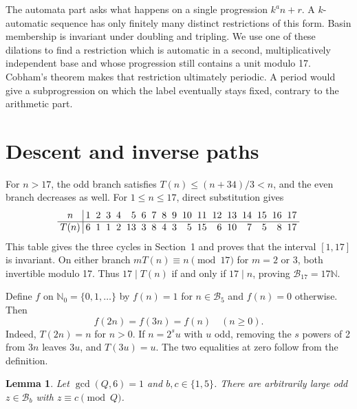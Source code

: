 \documentclass[11pt,a4paper]{article}
\newtheorem{lemma}[theorem]{Lemma}
\newcommand{\N}{\mathbb N}
\newcommand{\NN}{\mathbb N_0}
\newcommand{\B}{\mathcal B}
\begin{document}
The automata part asks what happens on a single progression $k^a n+r$. A $k$-automatic sequence has only finitely many distinct restrictions of this form. Basin membership is invariant under doubling and tripling. We use one of these dilations to find a restriction which is automatic in a second, multiplicatively independent base and whose progression still contains a unit modulo 17. Cobham's theorem makes that restriction ultimately periodic. A period would give a subprogression on which the label eventually stays fixed, contrary to the arithmetic part.

\newpage
\section{Descent and inverse paths}\label{sec:orbits}
For $n>17$, the odd branch satisfies $T(n)\le(n+34)/3<n$, and the even branch decreases as well. For $1\le n\le17$, direct substitution gives
\[
\setlength{\arraycolsep}{2.8pt}
\begin{array}{c|rrrrrrrrrrrrrrrrr}
 n&1&2&3&4&5&6&7&8&9&10&11&12&13&14&15&16&17\\ \hline
 T(n)&6&1&1&2&13&3&8&4&3&5&15&6&10&7&5&8&17
\end{array}
\]
This table gives the three cycles in Section~1 and proves that the interval $[1,17]$ is invariant. On either branch $mT(n)\equiv n\pmod{17}$ for $m=2$ or $3$, both invertible modulo 17. Thus $17\mid T(n)$ if and only if $17\mid n$, proving $\B_{17}=17\N$.

Define $f$ on $\NN=\{0,1,\ldots\}$ by $f(n)=1$ for $n\in\B_5$ and $f(n)=0$ otherwise. Then
\begin{equation}\label{eq:dilate}
                     f(2n)=f(3n)=f(n)\quad(n\ge0).
\end{equation}
Indeed, $T(2n)=n$ for $n>0$. If $n=2^su$ with $u$ odd, removing the $s$ powers of 2 from $3n$ leaves $3u$, and $T(3u)=u$. The two equalities at zero follow from the definition.

\begin{lemma}\label{lem:rough}
Let $\gcd(Q,6)=1$ and $b,c\in\{1,5\}$. There are arbitrarily large odd $z\in\B_b$ with $z\equiv c\pmod Q$.
\end{lemma}
\end{document}

